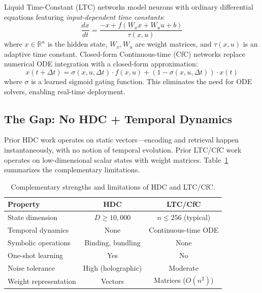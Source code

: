 \documentclass{article}
\newcommand{\R}{\mathbb{R}}
\begin{document}
Liquid Time-Constant (LTC) networks \cite{hasani2021liquid} model neurons with ordinary differential equations featuring \emph{input-dependent time constants}:
\begin{equation}\label{eq:ltc}
    \frac{dx}{dt} = \frac{-x + f(W_x x + W_u u + b)}{\tau(x, u)}
\end{equation}
where $x \in \R^n$ is the hidden state, $W_x, W_u$ are weight matrices, and $\tau(x,u)$ is an adaptive time constant. Closed-form Continuous-time (CfC) networks \cite{hasani2022closed} replace numerical ODE integration with a closed-form approximation:
\begin{equation}\label{eq:cfc}
    x(t{+}\Delta t) = \sigma(x, u, \Delta t) \cdot f(x, u) + (1 - \sigma(x, u, \Delta t)) \cdot x(t)
\end{equation}
where $\sigma$ is a learned sigmoid gating function. This eliminates the need for ODE solvers, enabling real-time deployment.

\subsection{The Gap: No HDC + Temporal Dynamics}

Prior HDC work operates on static vectors---encoding and retrieval happen instantaneously, with no notion of temporal evolution. Prior LTC/CfC work operates on low-dimensional scalar states with weight matrices. Table~\ref{tab:gap} summarizes the complementary limitations.

\begin{table}[h]
\centering
\caption{Complementary strengths and limitations of HDC and LTC/CfC.}
\label{tab:gap}
\begin{tabular}{lcc}
\toprule
\textbf{Property} & \textbf{HDC} & \textbf{LTC/CfC} \\
\midrule
State dimension & $D \geq 10{,}000$ & $n \leq 256$ (typical) \\
Temporal dynamics & None & Continuous-time ODE \\
Symbolic operations & Binding, bundling & None \\
One-shot learning & Yes & No \\
Noise tolerance & High (holographic) & Moderate \\
Weight representation & Vectors & Matrices ($O(n^2)$) \\
\bottomrule
\end{tabular}
\end{table}

\end{document}
